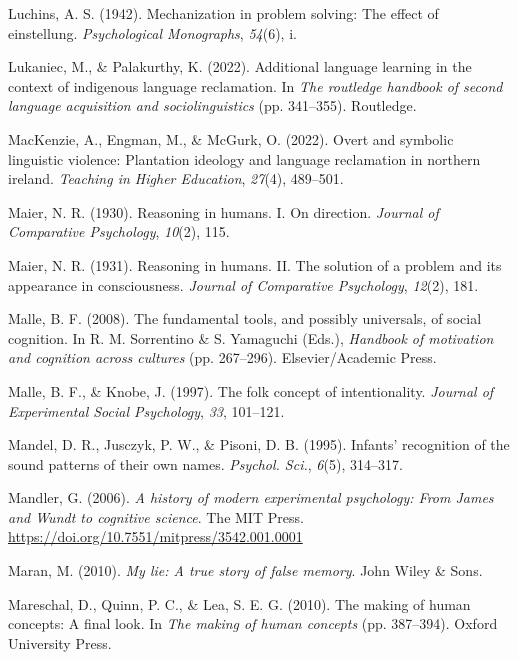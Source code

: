 \documentclass[
]{krantz}
\newlength{\cslhangindent}
\newenvironment{CSLReferences}[2] %
 {\begin{list}{}{%
  \setlength{\itemindent}{0pt}
  \setlength{\leftmargin}{0pt}
  \setlength{\parsep}{0pt}
  \ifodd #1
   \setlength{\leftmargin}{\cslhangindent}
   \setlength{\itemindent}{-1\cslhangindent}
  \fi
  \setlength{\itemsep}{#2\baselineskip}}}
 {\end{list}}
\begin{document}
\begin{CSLReferences}{1}{0}
Luchins, A. S. (1942). Mechanization in problem solving: The effect of einstellung. \emph{Psychological Monographs}, \emph{54}(6), i.

Lukaniec, M., \& Palakurthy, K. (2022). Additional language learning in the context of indigenous language reclamation. In \emph{The routledge handbook of second language acquisition and sociolinguistics} (pp. 341--355). Routledge.

MacKenzie, A., Engman, M., \& McGurk, O. (2022). Overt and symbolic linguistic violence: Plantation ideology and language reclamation in northern ireland. \emph{Teaching in Higher Education}, \emph{27}(4), 489--501.

Maier, N. R. (1930). Reasoning in humans. I. On direction. \emph{Journal of Comparative Psychology}, \emph{10}(2), 115.

Maier, N. R. (1931). Reasoning in humans. II. The solution of a problem and its appearance in consciousness. \emph{Journal of Comparative Psychology}, \emph{12}(2), 181.

Malle, B. F. (2008). The fundamental tools, and possibly universals, of social cognition. In R. M. Sorrentino \& S. Yamaguchi (Eds.), \emph{Handbook of motivation and cognition across cultures} (pp. 267--296). Elsevier/Academic Press.

Malle, B. F., \& Knobe, J. (1997). The folk concept of intentionality. \emph{Journal of Experimental Social Psychology}, \emph{33}, 101--121.

Mandel, D. R., Jusczyk, P. W., \& Pisoni, D. B. (1995). Infants' recognition of the sound patterns of their own names. \emph{Psychol. Sci.}, \emph{6}(5), 314--317.

Mandler, G. (2006). \emph{A history of modern experimental psychology: {From James} and {Wundt} to cognitive science}. The MIT Press. \url{https://doi.org/10.7551/mitpress/3542.001.0001}

Maran, M. (2010). \emph{My lie: A true story of false memory}. John Wiley \& Sons.

Mareschal, D., Quinn, P. C., \& Lea, S. E. G. (2010). The making of human concepts: A final look. In \emph{The making of human concepts} (pp. 387--394). Oxford University Press.


\end{CSLReferences}
\end{document}
